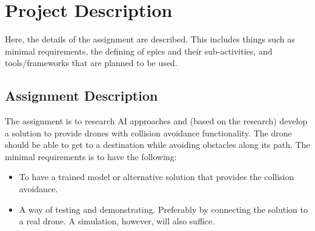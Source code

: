 \chapter{Project Description}
\label{ch:project_desc}

Here, the details of the assignment are described. This includes things such as minimal requirements, the defining of epics and their sub-activities, and tools/frameworks that are planned to be used.

\section{Assignment Description}
\label{sec:ass_desc}
The assignment is to research \gls{AI} approaches and (based on the research) develop a solution to provide drones with collision avoidance functionality. The drone should be able to get to a destination while avoiding obstacles along its path. The minimal requirements is to have the following:
\begin{itemize}
	\item To have a trained model or alternative solution that provides the collision avoidance.
	\item A way of testing and demonstrating. Preferably by connecting the solution to a real drone. A simulation, however, will also suffice.
\end{itemize}

